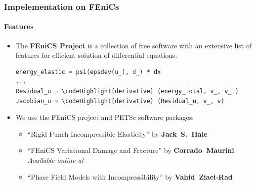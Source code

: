 \documentclass{beamer}
\newcommand{\SectionFour}{Impelementation on FEniCs}
\let\cite\shortcite
\begin{document}
\begin{frame}[fragile, label=fenics]
	\frametitle{\SectionFour}
	\framesubtitle{Features}
	\begin{itemize}
		\setlength\itemsep{2em}
		\item The \textbf{FEniCS Project} is a collection of free software with an extensive list of features for efficient solution of differential equations. \\
\newcommand\codeHighlight[1]{\textcolor[rgb]{1,0,0}{\textbf{#1}}}
\begin{Verbatim}[commandchars=\\\{\}]
energy_elastic = psi(epsdev(u_), d_) * dx
...
Residual_u = \codeHighlight{derivative} (energy_total, v_, v_t)
Jacobian_u = \codeHighlight{derivative} (Residual_u, v_, v)
\end{Verbatim}		
		\item We use the FEniCS project and PETSc software packages:
		\begin{itemize}
			\item ``Rigid Punch Incompressible Elasticity'' by \textbf{Jack~S.~Hale}
			\item ``FEniCS Variational Damage and Fracture'' by \textbf{Corrado~Maurini}
			\textit{Available online at {}}
			\item ``Phase Field Models with Incompressibility'' by \textbf{Vahid~Ziaei-Rad}
		\end{itemize}
	\end{itemize}
	\hyperlink{subfstvarii}{}
\end{frame}

\end{document}
